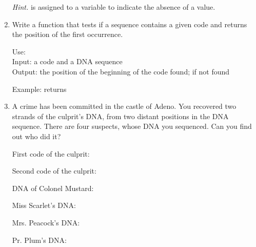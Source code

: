 \documentclass[11pt,class=report,crop=false]{standalone}
\begin{document}
\begin{activite}[DNA]
\begin{enumerate}
  \emph{Hint.}  is assigned to a variable to indicate the absence of a value. 
  
\medskip
   
  \item Write a  function that tests if a sequence contains a given code and returns the position of the first occurrence.
  
   \medskip
   
  \begin{fonction}[\ci{position()}]
  Use:  \\
  Input: a code and a DNA sequence \\
  Output: the position of the beginning of the code found;  if not found
  
  \medskip
    
  Example:  returns 
  \end{fonction}
  
    \medskip
  
  \item A crime has been committed in the castle of Adeno. 
You recovered two strands of the culprit's DNA, from two distant positions in the DNA sequence. There are four suspects, whose DNA you sequenced.
Can you find out who did it?

First code of the culprit:  

Second code of the culprit: 

\medskip

{\footnotesize
DNA of Colonel Mustard:


Miss Scarlet's DNA:



Mrs. Peacock's DNA:


Pr. Plum's DNA:


}
\end{enumerate}
\end{activite}


\end{document}
